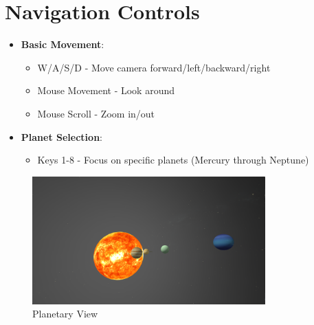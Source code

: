 \documentclass[12pt]{report}
\begin{document}
\section{Navigation Controls}
\begin{itemize}
    \item \textbf{Basic Movement}:
        \begin{itemize}
            \item W/A/S/D - Move camera forward/left/backward/right
            \item Mouse Movement - Look around
            \item Mouse Scroll - Zoom in/out
        \end{itemize}
    \item \textbf{Planet Selection}:
        \begin{itemize}
            \item Keys 1-8 - Focus on specific planets (Mercury through Neptune)
        \end{itemize}
\end{itemize}

\begin{figure}[H]
\centering
\includegraphics[width=0.8\textwidth]{planets.png}
\caption{Planetary View}
\label{fig:planets_view}
\end{figure}
\end{document}
